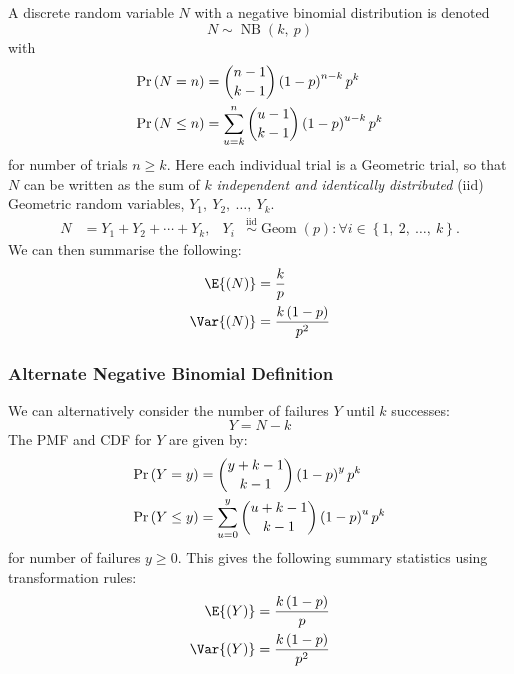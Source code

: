 \documentclass{article}
\begin{document}
\begin{multicols}{3}
    A discrete random variable \(N\) with a negative binomial distribution is denoted
    \begin{equation*}
        N \sim \operatorname{NB}{\left( k,\: p \right)}
    \end{equation*}
    with
    \begin{align*}
        \Pr{\left( N = n \right)}    & = \dbinom{n - 1}{k - 1} \left( 1 - p \right)^{n - k} p^k                \\
        \Pr{\left( N \leq n \right)} & = \sum_{u = k}^n \dbinom{u - 1}{k - 1} \left( 1 - p \right)^{u - k} p^k
    \end{align*}
    for number of trials \(n \geq k\).
    Here each individual trial is a Geometric trial, so that \(N\) can be written as the sum of
    \(k\) \textit{independent and identically distributed} (iid) Geometric random variables, \(Y_1,\: Y_2,\: \dots,\: Y_k\).
    \begin{align*}
        N & = Y_1 + Y_2 + \cdots + Y_k, & Y_i & \overset{\mathrm{iid}}{\sim} \operatorname{Geom}{\left( p \right)} : \forall i \in \left\{ 1,\: 2,\: \dots,\: k \right\}.
    \end{align*}
    We can then summarise the following:
    \begin{align*}
        \E{\left( N \right)}   & = \frac{k}{p}                        \\
        \Var{\left( N \right)} & = \frac{k \left( 1 - p \right)}{p^2}
    \end{align*}
    \subsubsection{Alternate Negative Binomial Definition}
    We can alternatively consider the number of failures \(Y\) until \(k\) successes:
    \begin{equation*}
        Y = N - k
    \end{equation*}
    The PMF and CDF for \(Y\) are given by:
    \begin{align*}
        \Pr{\left( Y = y \right)}    & = \dbinom{y + k - 1}{k - 1} \left( 1 - p \right)^y p^k                \\
        \Pr{\left( Y \leq y \right)} & = \sum_{u = 0}^y \dbinom{u + k - 1}{k - 1} \left( 1 - p \right)^u p^k
    \end{align*}
    for number of failures \(y \geq 0\). This gives the following summary statistics using
    transformation rules:
    \begin{align*}
        \E{\left( Y \right)}   & = \frac{k \left( 1 - p \right)}{p}   \\
        \Var{\left( Y \right)} & = \frac{k \left( 1 - p \right)}{p^2}
    \end{align*}

\end{multicols}
\end{document}
